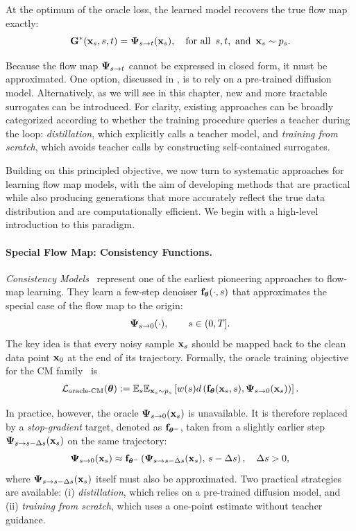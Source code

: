 At the optimum of the oracle loss, the learned model recovers the true flow map
exactly:
\[
{\mathbf{G}}^*({\mathbf{x}}_s, s, t) = {\bm{\Psi}}_{s\to t}({\mathbf{x}}_s), \quad \text{for all }\, s,t, \text{ and }\, {\mathbf{x}}_s \sim p_s.
\]


Because the flow map ${\bm{\Psi}}_{s\to t}$ cannot be expressed in closed form, it must be approximated. 
One option, discussed in , is to rely on a pre-trained diffusion model. 
Alternatively, as we will see in this chapter, new and more tractable surrogates can be introduced. 
For clarity, existing approaches can be broadly categorized according to whether the training procedure queries a teacher during the loop: 
\emph{distillation}, which explicitly calls a teacher model, and 
\emph{training from scratch}, which avoids teacher calls by constructing self-contained surrogates.



Building on this principled
objective, we now turn to systematic approaches for learning flow map models,
with the aim of developing methods that are practical while also producing
generations that more accurately reflect the true data distribution and are
computationally efficient. We begin with a high-level introduction to this paradigm.
\paragraph{Special Flow Map: Consistency Functions.}
\emph{Consistency Models}~\citep{song2023consistency} represent one of the earliest pioneering approaches to flow-map learning. 
They learn a few-step denoiser ${\mathbf{f}}_{\bm{\theta}}(\cdot,s)$ that approximates the special case of the flow map to the origin:
\[
{\bm{\Psi}}_{s\to 0}(\cdot), \qquad s \in (0,T].
\]
The key idea is that every noisy sample ${\mathbf{x}}_s$ should be mapped back to the clean data point ${\mathbf{x}}_0$ at the end of its trajectory. 
Formally, the oracle training objective for the CM family~\citep{song2023consistency,songimproved,geng2024consistency,lu2024simplifying} is
\begin{align}\label{eq:oracle-cm}
    \mathcal{L}_{\mathrm{oracle}\text{-}\mathrm{CM}}({\bm{\theta}}) 
    := \mathbb{E}_{s} \mathbb{E}_{{\mathbf{x}}_s\sim p_s} \left[ w(s)  d \left({\mathbf{f}}_{\bm{\theta}}({\mathbf{x}}_s,s), {\bm{\Psi}}_{s\to 0}({\mathbf{x}}_s)\right)\right].
\end{align}




In practice, however, the oracle ${\bm{\Psi}}_{s\to 0}({\mathbf{x}}_s)$ is unavailable. It is therefore replaced by a \emph{stop-gradient} target, denoted as ${\mathbf{f}}_{{\bm{\theta}}^-}$, taken from a slightly earlier step ${\bm{\Psi}}_{s\to s-\Delta s}({\mathbf{x}}_s)$ on the same trajectory:
\[
{\bm{\Psi}}_{s\to 0}({\mathbf{x}}_s) \approx {\mathbf{f}}_{{\bm{\theta}}^-} \left({\bm{\Psi}}_{s\to s-\Delta s}({\mathbf{x}}_s),\,s-\Delta s\right), \quad \Delta s > 0,
\]
where ${\bm{\Psi}}_{s\to s-\Delta s}({\mathbf{x}}_s)$ itself must also be approximated. Two
practical strategies are available: (i) \emph{distillation}, which relies on a
pre-trained diffusion model, and (ii) \emph{training from scratch}, which uses a
one-point estimate without teacher guidance.

